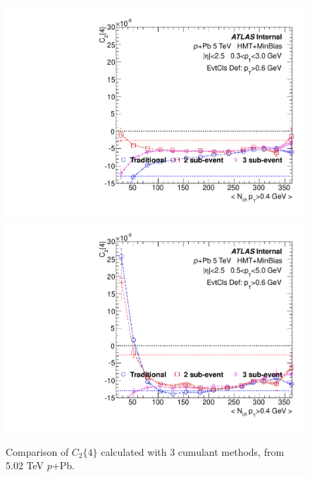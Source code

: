 \begin{figure}[p]
\includegraphics[width=0.4\linewidth]{figs/sec_result/pPb5/phy_4PC_Har0_Pt0_Cls3.pdf}
\includegraphics[width=0.4\linewidth]{figs/sec_result/pPb5/phy_4PC_Har0_Pt1_Cls3.pdf}
\caption{Comparison of $C_{2}\{4\}$ calculated with 3 cumulant methods, from 5.02 TeV $p$+Pb.}
\label{fig:result_pPb5_C24}
\end{figure}
\clearpage

